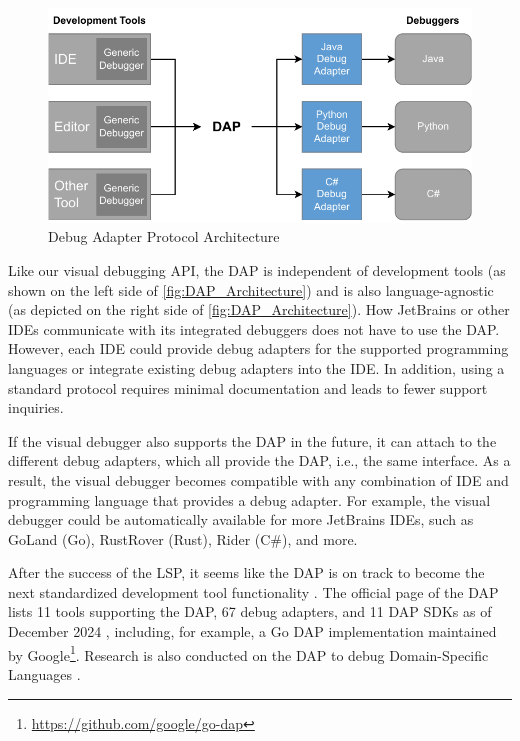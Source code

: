 \documentclass[sigconf]{acmart}
\begin{document}
\begin{figure}[ht]
  \centering
  \includegraphics[width=1\linewidth]{images/visual-debugger-DAP-architecture.pdf}
  \caption{Debug Adapter Protocol Architecture \cite{microsoftDebugAdapterProtocol2023}}
  \label{fig:DAP_Architecture}
\end{figure}

Like our visual debugging API, the DAP is independent of development tools (as shown on the left side of \autoref{fig:DAP_Architecture}) and is also language-agnostic (as depicted on the right side of \autoref{fig:DAP_Architecture}).
How JetBrains or other IDEs communicate with its integrated debuggers does not have to use the DAP.
However, each IDE could provide debug adapters for the supported programming languages or integrate existing debug adapters into the IDE.
In addition, using a standard protocol requires minimal documentation and leads to fewer support inquiries.

If the visual debugger also supports the DAP in the future, it can attach to the different debug adapters, which all provide the DAP, i.e., the same interface.
As a result, the visual debugger becomes compatible with any combination of IDE and programming language that provides a debug adapter.
For example, the visual debugger could be automatically available for more JetBrains IDEs, such as GoLand (Go), RustRover (Rust), Rider (C\#), and more.

After the success of the LSP, it seems like the DAP is on track to become the next standardized development tool functionality \cite{raskVisualStudioCode2020,borkLanguageServerProtocol2023}.
The official page of the DAP lists 11 tools supporting the DAP, 67 debug adapters, and 11 DAP SDKs as of December 2024 \cite{microsoftDebugAdapterProtocol2023}, including, for example, a Go DAP implementation maintained by Google\footnote{\url{https://github.com/google/go-dap}}.
Research is also conducted on the DAP to debug Domain-Specific Languages \cite{jeanjeanIDECodeReifying2021,enetProtocolBasedInteractiveDebugging2023}.
\end{document}
